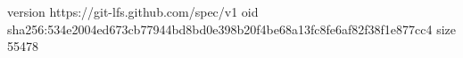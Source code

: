 version https://git-lfs.github.com/spec/v1
oid sha256:534e2004ed673cb77944bd8bd0e398b20f4be68a13fc8fe6af82f38f1e877cc4
size 55478
